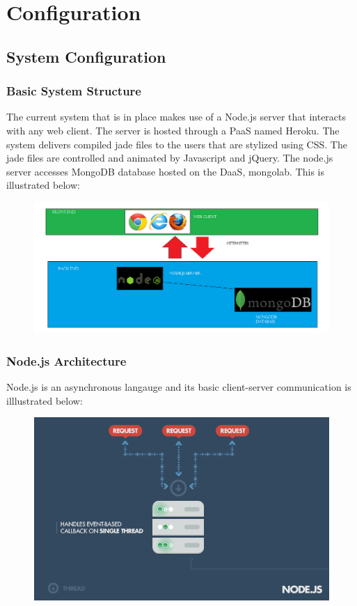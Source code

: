\documentclass[14pt, a4paper]{article}
\begin{document}
\newpage

\section{Configuration}
\subsection{System Configuration}
\subsubsection{Basic System Structure}
The current system that is in place makes use of a Node.js server that interacts with any web client. The server is hosted through a PaaS named Heroku. The system delivers compiled jade files to the users that are stylized using CSS. The jade files are controlled and animated by Javascript and jQuery. The node.js server accesses MongoDB database hosted on the DaaS, mongolab. This is illustrated below:
\begin{figure}[h!]
\includegraphics[width=1.0\textwidth]{Graphics/Screenshots/infrastructure}
\end{figure}
\newpage
\subsubsection{Node.js Architecture}
Node.js is an asynchronous langauge and its basic client-server communication is illlustrated below:
\begin{figure}[h!]
\includegraphics[width=1.0\textwidth]{Graphics/Screenshots/nodejsinfrastructure}
\end{figure}
\end{document}
